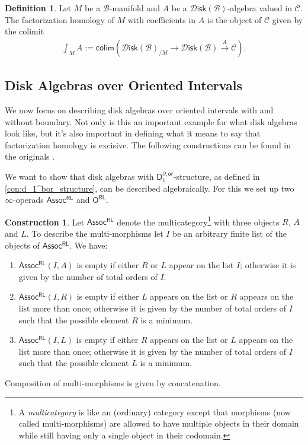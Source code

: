 \documentclass[12pt,a4paper]{article}
\newcounter{counter} \numberwithin{counter}{section}
\theoremstyle{definition}
\newtheorem{definition}[counter]{Definition}
\newtheorem{construction}[counter]{Construction}
\theoremstyle{plain}
\theoremstyle{remark}
\newcommand{\catC}{\mathscr{C}}
\newcommand{\disk}{\mathscr{D} \mathsf{isk}}
\newcommand{\bstr}{\mathscr{B}}
\begin{document}
\begin{definition}
    Let $M$ be a $\bstr$-manifold and $A$ be a $\disk(\bstr)$-algebra valued in $\catC$. The factorization homology of $M$ with coefficients in $A$ is the object of $\catC$ given by the colimit
    \begin{align}
        \int_M A := \mathsf{colim} \left(\disk(\bstr)_{/M} \rightarrow \disk(\bstr) \xrightarrow{A} \catC \right).
    \end{align}
\end{definition}


\subsection{Disk Algebras over Oriented Intervals}\label{ch:fh_on_intervals}

We now focus on describing disk algebras over oriented intervals with and without boundary. Not only is this an important example for what disk algebras look like, but it's also important in defining what it means to say that factorization homology is excisive. The following constructions can be found in the originals \cite{af_fhtop,aft_fhstrat}.

We want to show that disk algebras with $\mathsf{D}_1^{\partial, \mathsf{or}}$-structure, as defined in \cref{con:d_1^bor_structure}, can be described algebraically. For this we set up two $\infty$-operads $\mathsf{Assoc^{RL}}$ and $\mathsf{O^{RL}}$.

\begin{construction}\label{con:assocRL}
    Let $\mathsf{Assoc^{RL}}$ denote the multicategory\footnote{A \emph{multicategory} is like an (ordinary) category except that morphisms (now called multi-morphisms) are allowed to have multiple objects in their domain while still having only a single object in their codomain.} with three objects $R$, $A$ and $L$. To describe the multi-morphisms let $I$ be an arbitrary finite list of the objects of $\mathsf{Assoc^{RL}}$. We have:
    \begin{enumerate}
        \item $\mathsf{Assoc^{RL}}(I, A)$ is empty if either $R$ or $L$ appear on the list $I$; otherwise it is given by the number of total orders of $I$.
        \item $\mathsf{Assoc^{RL}}(I, R)$ is empty if either $L$ appears on the list or $R$ appears on the list more than once; otherwise it is given by the number of total orders of $I$ such that the possible element $R$ is a minimum.
        \item $\mathsf{Assoc^{RL}}(I, L)$ is empty if either $R$ appears on the list or $L$ appears on the list more than once; otherwise it is given by the number of total orders of $I$ such that the possible element $L$ is a minimum.
    \end{enumerate}
    Composition of multi-morphisms is given by concatenation. 
\end{construction}
\end{document}
